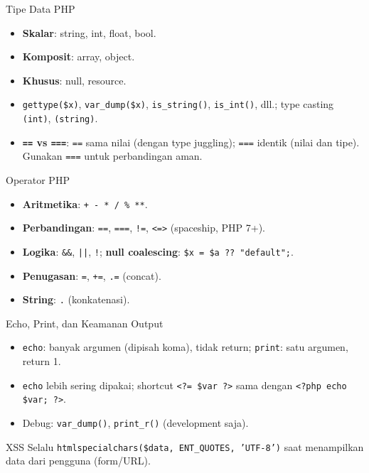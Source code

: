 \documentclass[handout]{beamer}
\begin{document}
\begin{frame}{Tipe Data PHP}
	\begin{itemize}
		\item \textbf{Skalar}: string, int, float, bool.
		\item \textbf{Komposit}: array, object.
		\item \textbf{Khusus}: null, resource.
		\item \texttt{gettype(\$x)}, \texttt{var\_dump(\$x)}, \texttt{is\_string()}, \texttt{is\_int()}, dll.; type casting \texttt{(int)}, \texttt{(string)}.
		\item \textbf{\texttt{==} vs \texttt{===}}: \texttt{==} sama nilai (dengan type juggling); \texttt{===} identik (nilai dan tipe). Gunakan \texttt{===} untuk perbandingan aman.
	\end{itemize}
\end{frame}

\begin{frame}{Operator PHP}
	\begin{itemize}
		\item \textbf{Aritmetika}: \texttt{+ - * / \% **}.
		\item \textbf{Perbandingan}: \texttt{==}, \texttt{===}, \texttt{!=}, \texttt{<=>} (spaceship, PHP 7+).
		\item \textbf{Logika}: \texttt{\&\&}, \texttt{||}, \texttt{!}; \textbf{null coalescing}: \texttt{\$x = \$a ?? "default";}.
		\item \textbf{Penugasan}: \texttt{=}, \texttt{+=}, \texttt{.=} (concat).
		\item \textbf{String}: \texttt{.} (konkatenasi).
	\end{itemize}
\end{frame}

\begin{frame}{Echo, Print, dan Keamanan Output}
	\begin{itemize}
		\item \texttt{echo}: banyak argumen (dipisah koma), tidak return; \texttt{print}: satu argumen, return 1.
		\item \texttt{echo} lebih sering dipakai; shortcut \texttt{<?= \$var ?>} sama dengan \texttt{<?php echo \$var; ?>}.
		\item Debug: \texttt{var\_dump()}, \texttt{print\_r()} (development saja).
	\end{itemize}
	\begin{block}{XSS}
		Selalu \texttt{htmlspecialchars(\$data, ENT\_QUOTES, 'UTF-8')} saat menampilkan data dari pengguna (form/URL).
	\end{block}
\end{frame}
\end{document}
